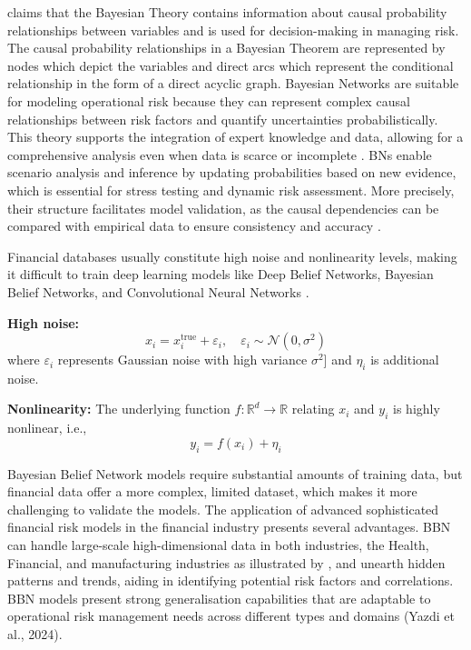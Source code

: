 \textcite{pearl1988probabilistic} claims that the Bayesian Theory contains information about causal probability relationships between variables and is used for decision-making in managing risk. The causal probability relationships in a Bayesian Theorem are represented by nodes which depict the variables and direct arcs which represent the conditional relationship in the form of a direct acyclic graph. Bayesian Networks are suitable for modeling operational risk because they can represent complex causal relationships between risk factors and quantify uncertainties probabilistically. This theory supports the integration of expert knowledge and data, allowing for a comprehensive analysis even when data is scarce or incomplete \parencite{alexander2006bayesian}. BNs enable scenario analysis and inference by updating probabilities based on new evidence, which is essential for stress testing and dynamic risk assessment. More precisely, their structure facilitates model validation, as the causal dependencies can be compared with empirical data to ensure consistency and accuracy \parencite{cowell_modeling_2007}.

Financial databases usually constitute high noise and nonlinearity levels, making it difficult to train deep learning models like Deep Belief Networks, Bayesian Belief Networks, and Convolutional Neural Networks \parencite{liu_risk_2021}.

\textbf{High noise:}
\begin{equation}
x_i = x_i^{\text{true}} + \varepsilon_i, \quad \varepsilon_i \sim \mathcal{N}(0, \sigma^2)
\end{equation}
where \( \varepsilon_i \) represents Gaussian noise with high variance \( \sigma^2 \)] and \( \eta_i \) is additional noise.
\vspace{10pt}

\textbf{Nonlinearity:}
The underlying function \( f: \mathbb{R}^d \rightarrow \mathbb{R} \) relating \( x_i \) and \( y_i \) is highly nonlinear, i.e.,
\begin{equation}
y_i = f(x_i) + \eta_i
\end{equation}

Bayesian Belief Network models require substantial amounts of training data, but financial data offer a more complex, limited dataset, which makes it more challenging to validate the models. The application of advanced sophisticated financial risk models in the financial industry presents several advantages. BBN can handle large-scale high-dimensional data in both industries, the Health, Financial, and manufacturing industries as illustrated by \textcite{zhao_data_2024}, and unearth hidden patterns and trends, aiding in identifying potential risk factors and correlations. BBN models present strong generalisation capabilities that are adaptable to operational risk management needs across different types and domains (Yazdi et al., 2024). 


